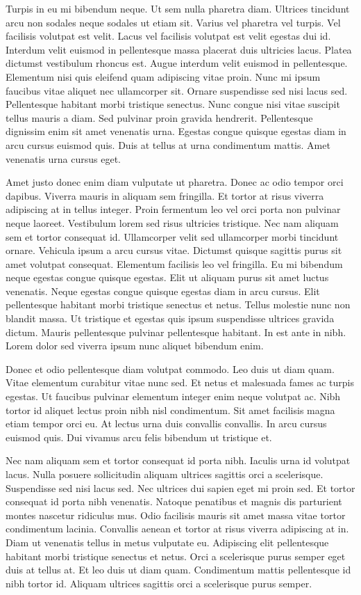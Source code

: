 \documentclass[11pt,a4paper]{article}
\begin{document}
Turpis in eu mi bibendum neque. Ut sem nulla pharetra diam. Ultrices tincidunt arcu non sodales neque sodales ut etiam sit. Varius vel pharetra vel turpis. Vel facilisis volutpat est velit. Lacus vel facilisis volutpat est velit egestas dui id. Interdum velit euismod in pellentesque massa placerat duis ultricies lacus. Platea dictumst vestibulum rhoncus est. Augue interdum velit euismod in pellentesque. Elementum nisi quis eleifend quam adipiscing vitae proin. Nunc mi ipsum faucibus vitae aliquet nec ullamcorper sit. Ornare suspendisse sed nisi lacus sed. Pellentesque habitant morbi tristique senectus. Nunc congue nisi vitae suscipit tellus mauris a diam. Sed pulvinar proin gravida hendrerit. Pellentesque dignissim enim sit amet venenatis urna. Egestas congue quisque egestas diam in arcu cursus euismod quis. Duis at tellus at urna condimentum mattis. Amet venenatis urna cursus eget.

Amet justo donec enim diam vulputate ut pharetra. Donec ac odio tempor orci dapibus. Viverra mauris in aliquam sem fringilla. Et tortor at risus viverra adipiscing at in tellus integer. Proin fermentum leo vel orci porta non pulvinar neque laoreet. Vestibulum lorem sed risus ultricies tristique. Nec nam aliquam sem et tortor consequat id. Ullamcorper velit sed ullamcorper morbi tincidunt ornare. Vehicula ipsum a arcu cursus vitae. Dictumst quisque sagittis purus sit amet volutpat consequat. Elementum facilisis leo vel fringilla. Eu mi bibendum neque egestas congue quisque egestas. Elit ut aliquam purus sit amet luctus venenatis. Neque egestas congue quisque egestas diam in arcu cursus. Elit pellentesque habitant morbi tristique senectus et netus. Tellus molestie nunc non blandit massa. Ut tristique et egestas quis ipsum suspendisse ultrices gravida dictum. Mauris pellentesque pulvinar pellentesque habitant. In est ante in nibh. Lorem dolor sed viverra ipsum nunc aliquet bibendum enim.

Donec et odio pellentesque diam volutpat commodo. Leo duis ut diam quam. Vitae elementum curabitur vitae nunc sed. Et netus et malesuada fames ac turpis egestas. Ut faucibus pulvinar elementum integer enim neque volutpat ac. Nibh tortor id aliquet lectus proin nibh nisl condimentum. Sit amet facilisis magna etiam tempor orci eu. At lectus urna duis convallis convallis. In arcu cursus euismod quis. Dui vivamus arcu felis bibendum ut tristique et.

Nec nam aliquam sem et tortor consequat id porta nibh. Iaculis urna id volutpat lacus. Nulla posuere sollicitudin aliquam ultrices sagittis orci a scelerisque. Suspendisse sed nisi lacus sed. Nec ultrices dui sapien eget mi proin sed. Et tortor consequat id porta nibh venenatis. Natoque penatibus et magnis dis parturient montes nascetur ridiculus mus. Odio facilisis mauris sit amet massa vitae tortor condimentum lacinia. Convallis aenean et tortor at risus viverra adipiscing at in. Diam ut venenatis tellus in metus vulputate eu. Adipiscing elit pellentesque habitant morbi tristique senectus et netus. Orci a scelerisque purus semper eget duis at tellus at. Et leo duis ut diam quam. Condimentum mattis pellentesque id nibh tortor id. Aliquam ultrices sagittis orci a scelerisque purus semper.
\end{document}
